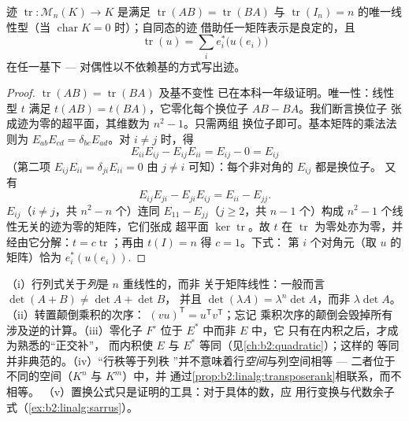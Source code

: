 \begin{proposition}\label{prop:b2:linalg:trace}
迹 $\operatorname{tr} \colon \mathcal{M}_n(K) \to K$ 是满足
$\operatorname{tr}(AB) =
\operatorname{tr}(BA)$ 与 $\operatorname{tr}(I_n) = n$ 的唯一线性型（当
$\operatorname{char} K = 0$ 时）；自同态的迹
借助任一矩阵表示是良定的，且
\[
\operatorname{tr}(u) = \sum_{i} e_i^*\bigl(u(e_i)\bigr)
\]
在任一基下 --- 对偶性以不依赖基的方式写出迹。
\end{proposition}

\begin{proof}
$\operatorname{tr}(AB) = \operatorname{tr}(BA)$ 及基不变性
已在本科一年级证明。唯一性：线性型 $t$ 满足 $t(AB) =
t(BA)$，它零化每个换位子 $AB - BA$。我们断言换位子
张成迹为零的超平面，其维数为 $n^2 - 1$。只需两组
换位子即可。基本矩阵的乘法法则为
$E_{ab}E_{cd} = \delta_{bc}E_{ad}$。对
$i \neq j$ 时，得
\[
E_{ii}E_{ij} - E_{ij}E_{ii} = E_{ij} - 0 = E_{ij}
\]
（第二项 $E_{ij}E_{ii} = \delta_{ji}E_{ii} = 0$
由 $j \neq i$ 可知）：每个非对角的 $E_{ij}$ 都是换位子。
又有
\[
E_{ij}E_{ji} - E_{ji}E_{ij} = E_{ii} - E_{jj} .
\]
$E_{ij}$（$i \neq j$，共 $n^2 - n$ 个）连同
$E_{11} - E_{jj}$（$j \geq 2$，共 $n - 1$ 个）构成
$n^2 - 1$ 个线性无关的迹为零的矩阵，它们张成
超平面 $\ker\operatorname{tr}$。故 $t$ 在
$\operatorname{tr}$ 为零处亦为零，并经由它分解：$t =
c\operatorname{tr}$；再由 $t(I) = n$ 得 $c = 1$。下式：
第 $i$ 个对角元（取 $u$ 的矩阵）恰为
$e_i^*(u(e_i))$.
\end{proof}

\begin{remark}[常见误区]\label{rem:b2:linalg:pitfalls}
（i）行列式关于\emph{列}是 $n$ 重线性的，而非
关于矩阵线性：一般而言 $\det(A + B) \neq \det A + \det B$，
并且 $\det(\lambda A) = \lambda^n\det A$，而非
$\lambda\det A$。（ii）转置颠倒乘积的次序：
$(vu)^{\mathsf T} = u^{\mathsf T}v^{\mathsf T}$；忘记
乘积次序的颠倒会毁掉所有涉及逆的计算。（iii）零化子 $F^\circ$
位于 $E^*$ 中而非 $E$ 中，它
只有在内积之后，才成为熟悉的“正交补”，
而内积使 $E$ 与 $E^*$ 等同（见\cref{ch:b2:quadratic}）；这样的
等同并非典范的。（iv）“行秩等于列秩
”并不意味着行\emph{空间}与列空间相等 ---
二者位于不同的空间（$K^n$ 与 $K^m$）中，并
通过\cref{prop:b2:linalg:transposerank}相联系，而不相等。
（v）置换公式只是证明的工具：对于具体的数，应
用行变换与代数余子式（\cref{ex:b2:linalg:sarrus}）。
\end{remark}

